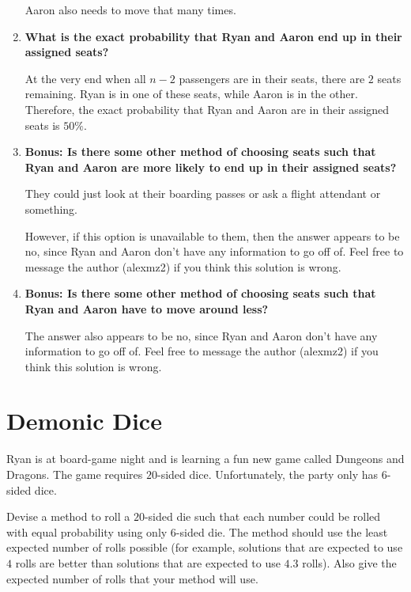 \documentclass{article}
\begin{document}
\begin{enumerate}[label=(\alph*)]
    Aaron also needs to move that many times.

    \vspace{2cm}
    
    \item \textbf{What is the exact probability that Ryan and Aaron end up in their assigned seats?}
    
    At the very end when all $n - 2$ passengers are in their seats, there are $2$ seats remaining. Ryan is in one of these seats, while Aaron is in the other. Therefore, the exact probability that Ryan and Aaron are in their assigned seats is $50\%$.

    \vspace{2cm}
    
    \item \textbf{Bonus: Is there some other method of choosing seats such that Ryan and Aaron are more likely to end up in their assigned seats?}
    
    They could just look at their boarding passes or ask a flight attendant or something.
    
    However, if this option is unavailable to them, then the answer appears to be $\boxed{\text{no}}$, since Ryan and Aaron don't have any information to go off of. Feel free to message the author (alexmz2) if you think this solution is wrong.

    \vspace{2cm}
    
    \item \textbf{Bonus: Is there some other method of choosing seats such that Ryan and Aaron have to move around less?}
    
    The answer also appears to be $\boxed{\text{no}}$, since Ryan and Aaron don't have any information to go off of. Feel free to message the author (alexmz2) if you think this solution is wrong.
    
\end{enumerate}

\newpage

\section{Demonic Dice}

Ryan is at board-game night and is learning a fun new game called Dungeons and Dragons. The game requires $20$-sided dice. Unfortunately, the party only has $6$-sided dice.

Devise a method to roll a $20$-sided die such that each number could be rolled with equal probability using only $6$-sided die. The method should use the least expected number of rolls possible (for example, solutions that are expected to use $4$ rolls are better than solutions that are expected to use $4.3$ rolls). Also give the expected number of rolls that your method will use.
\end{document}
